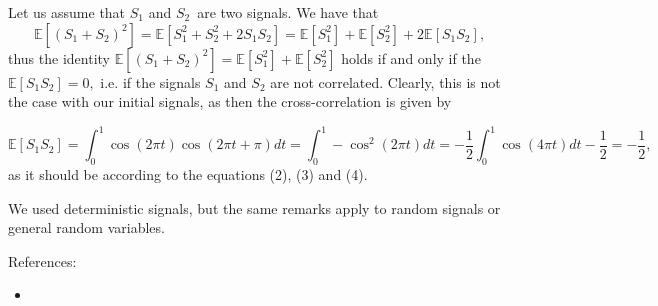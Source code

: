 \documentclass{article}
\begin{document}
Let us assume that $S_1$ and $S_2$ are two signals. We have that
\begin{equation}
  \mathbb{E}[(S_1 + S_2)^2] = \mathbb{E}[S_1^2 + S_2^2 + 2 S_1 S_2]= \mathbb{E}[S_1^2] + \mathbb{E}[S_2^2] + 2 \mathbb{E}[S_1 S_2],
\end{equation}
thus the identity $\mathbb{E}[(S_1 + S_2)^2] = \mathbb{E}[S_1^2] + \mathbb{E}[S_2^2] $ holds if and only if the  $\mathbb{E}[S_1 S_2] = 0,$ i.e. if the signals $S_1$ and $S_2$ are not correlated. Clearly, this is not the case with our initial signals, as then the cross-correlation is given by

$$
\mathbb{E}[S_1S_2] = \int_0^1 \cos(2 \pi t) \cos(2 \pi t + \pi) dt =\int_0^1 -\cos^2(2 \pi t )dt = - \frac{1}{2}\int_0^1 \cos(4 \pi t)dt - \frac{1}{2} = - \frac{1}{2},
$$
as it should be according to the equations (2), (3) and (4).

We used deterministic signals, but the same remarks apply to random signals or general random variables.

References:
\begin{itemize}
\item {} 
\end{itemize}
\end{document}
